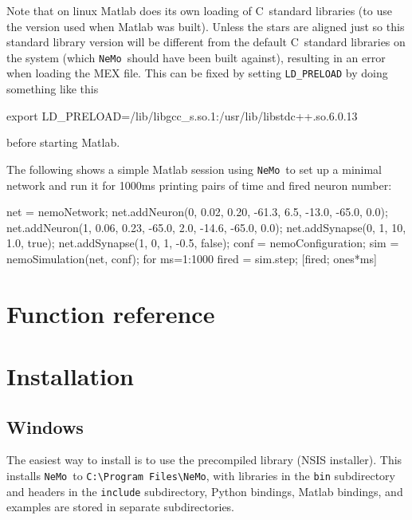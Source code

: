 \documentclass[a4paper]{article}
\newcommand{\nemo}{\texttt{NeMo}}
\newcommand{\code}[1]{\texttt{#1}}
\newcommand{\directory}[1]{\texttt{#1}}
\newcommand{\cpp}{C\nolinebreak\hspace{-.05em}\raisebox{.4ex}{\tiny\bf +}\nolinebreak\hspace{-.10em}\raisebox{.4ex}{\tiny\bf +}}
\begin{document}
Note that on linux Matlab does its own loading of \cpp\ standard libraries
	(to use the version used when Matlab was built).
Unless the stars are aligned just so this standard library version will be
different from the default \cpp\ standard libraries on the system (which \nemo\ should have been built against), resulting in an error when loading the MEX file.
This can be fixed by setting \code{LD\_PRELOAD} by doing something like this

\begin{shell}
export LD_PRELOAD=/lib/libgcc_s.so.1:/usr/lib/libstdc++.so.6.0.13
\end{shell}

before starting Matlab.

The following shows a simple Matlab session using \nemo\ to set up a minimal
network and run it for 1000ms printing pairs of time and fired neuron number:

\begin{matlab}
net = nemoNetwork;
net.addNeuron(0, 0.02, 0.20, -61.3, 6.5, -13.0, -65.0, 0.0);
net.addNeuron(1, 0.06, 0.23, -65.0, 2.0, -14.6, -65.0, 0.0);
net.addSynapse(0, 1, 10, 1.0, true);
net.addSynapse(1, 0, 1, -0.5, false);
conf = nemoConfiguration;
sim = nemoSimulation(net, conf);
for ms=1:1000 
	fired = sim.step;
	[fired; ones*ms]
\end{matlab}


\newpage
\section{Function reference}
\label{fnref}



\section{Installation}

\subsection{Windows}
\label{installation:windows}

The easiest way to install is to use the precompiled library (NSIS installer).
This installs \nemo\ to \directory{C:\textbackslash Program Files\textbackslash NeMo},
	with
		libraries in the \directory{bin} subdirectory and
		headers in the \directory{include} subdirectory,
Python bindings, Matlab bindings, and examples are stored in separate subdirectories.
\end{document}
